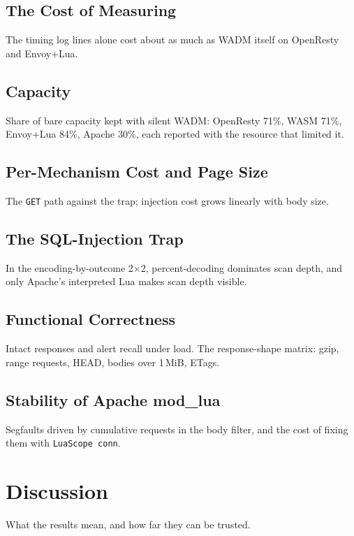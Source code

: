 \documentclass{rptuma}
\begin{document}
\section{The Cost of Measuring}
The timing log lines alone cost about as much as WADM itself on OpenResty and Envoy+Lua.

\section{Capacity}
Share of bare capacity kept with silent WADM: OpenResty 71\%, WASM 71\%, Envoy+Lua 84\%, Apache
30\%, each reported with the resource that limited it.

\section{Per-Mechanism Cost and Page Size}
The \texttt{GET} path against the trap; injection cost grows linearly with body size.

\section{The SQL-Injection Trap}
In the encoding-by-outcome 2$\times$2, percent-decoding dominates scan depth, and only Apache's
interpreted Lua makes scan depth visible.

\section{Functional Correctness}
Intact responses and alert recall under load. The response-shape matrix: gzip, range requests,
HEAD, bodies over 1\,MiB, ETags.

\section{Stability of Apache mod\_lua}
Segfaults driven by cumulative requests in the body filter, and the cost of fixing them with
\texttt{LuaScope conn}.

\chapter{Discussion}
What the results mean, and how far they can be trusted.
\end{document}
